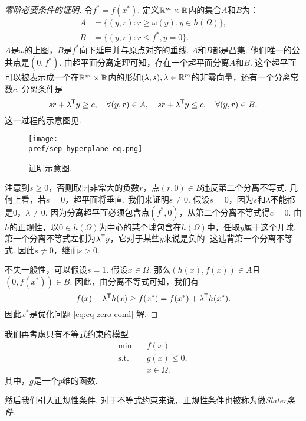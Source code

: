 \begin{proof}[零阶必要条件的证明]
令$f^\ast=f({x^\ast})$. 定义$\mathbb{R}^m\times\mathbb{R}$内的集合$A$和$B$为：
\begin{align*}
    A&=\{(y,r):r\ge \omega({y}),{y}\in h(\Omega)\},\\ 
    B&=\{(y,r):r\le f^\ast,y=0\}.
\end{align*}
$A$是$\omega$的上图，$B$是$f^\ast$向下延申并与原点对齐的垂线. $A$和$B$都是凸集. 他们唯一的公共点是$(0,f^\ast)$. 由超平面分离定理可知，存在一个超平面分离$A$和$B$. 这个超平面可以被表示成一个在$\mathbb{R}^m\times\mathbb{R}$内的形如$(\lambda,s),\lambda\in \mathbb{R}^{m}$的非零向量，还有一个分离常数$c$. 分离条件是$$sr+{\lambda^{\mathsf{T}} y}\ge c,\quad\forall(y,r)\in A,\quad sr+{\lambda^{\mathsf{T}} y}\le c,\quad\forall(y,r)\in B.$$ 
这一过程的示意图见.

\begin{figure}[ht]
    \centering
    \texttt{[image: \\pref/sep-hyperplane-eq.png]}
    \caption{证明示意图. }
    \label{fig:sep-hyperplane-eq}
\end{figure}

注意到$s\ge 0$，否则取$|r|$非常大的负数$r$，点$(r,{0})\in B$违反第二个分离不等式. 几何上看，若$s=0$，超平面将垂直. 我们来证明$s\neq 0$. 假设$s=0$，因为$s$和${\lambda}$不能都是$0$，${\lambda\neq 0}$. 因为分离超平面必须包含点$(f^\ast,{0})$，从第二个分离不等式得$c=0$. 由$h$的正规性，以${0\in h(\Omega)}$为中心的某个球包含在$h(\Omega)$中，任取$y$属于这个开球. 第一个分离不等式左侧为${\lambda^{\mathsf{T}} y}$，它对于某些${y}$来说是负的. 这违背第一个分离不等式. 因此$s\neq 0$，继而$s>0$. 

不失一般性，可以假设$s=1$. 假设$x\in\Omega$. 那么$(h(x),f(x))\in A$且$(0,f(x^\ast))\in B$. 因此，由分离不等式可知，我们有$$f({x})+{\lambda^{\mathsf{T}} h(x)}\ge f({x^\ast})=f({x^\ast})+{\lambda^{\mathsf{T}} h(x^\ast)}.$$ 因此${x^\ast}$是优化问题 \eqref{eq:eq-zero-cond} 解. 
\end{proof}

我们再考虑只有不等式约束的模型
\begin{equation}
    \begin{aligned}
    \min\quad & f({x})\\
    \text{s.t.}\quad& {g(x)\le 0},\\
    &{x}\in\Omega.
\end{aligned}\label{eq:ineq-zero-cond}
\end{equation}
其中，${g}$是一个$p$维的函数. 


然后我们引入正规性条件. 对于不等式约束来说，正规性条件也被称为做\emph{Slater条件}. 

